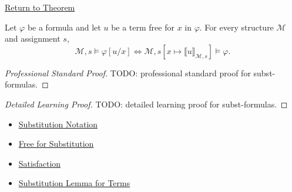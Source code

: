 \newpage
{}
\label{prf:subst-formulas}

\begin{remark*}[Return]
\hyperref[lem:subst-formulas]{Return to Theorem}
\end{remark*}

\begin{theorem*}
Let \(\varphi\) be a formula and let \(u\) be a term free for \(x\) in
\(\varphi\). For every structure \(\mathcal M\) and assignment \(s\),
\[
\mathcal M,s\models\varphi[u/x]
\Longleftrightarrow
\mathcal M,s[x\mapsto\llbracket u\rrbracket_{\mathcal M,s}]\models\varphi.
\]
\end{theorem*}

\begin{proof}[Professional Standard Proof]
\LRAProofBodyStart
TODO: professional standard proof for subst-formulas.
\end{proof}

\begin{proof}[Detailed Learning Proof]
\LRAProofBodyStart
TODO: detailed learning proof for subst-formulas.
\end{proof}

\begin{remark*}
\end{remark*}

\begin{dependencies}
\begin{itemize}
  \item \hyperref[def:subst-notation]{Substitution Notation}
  \item \hyperref[def:free-for]{Free for Substitution}
  \item \hyperref[def:fol-satisfaction]{Satisfaction}
  \item \hyperref[lem:subst-terms]{Substitution Lemma for Terms}
\end{itemize}
\end{dependencies}

\clearpage
